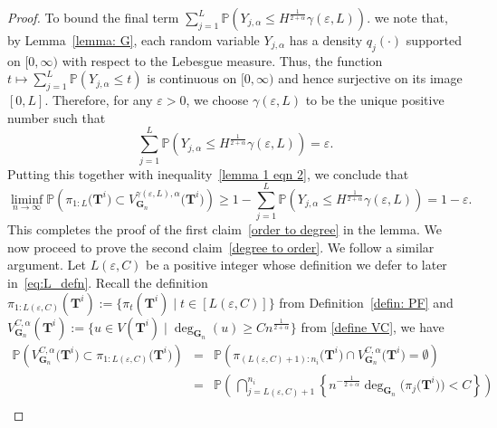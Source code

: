\documentclass[twoside,11pt]{article}
\theoremstyle{remark}
\begin{document}
\begin{proof}
To bound the final term $\sum_{j=1}^L \mathbb{P}\left(Y_{j, \alpha} \leq H^{\frac{1}{2+\alpha}} \gamma\left(\varepsilon, L\right)\right)$.
we note that, by Lemma~\ref{lemma: G}, each random variable $Y_{j, \alpha}$ has a density $q_j(\cdot)$ supported on $[0, \infty)$ with respect to the Lebesgue measure. Thus, the function $t \mapsto \sum_{j=1}^L \mathbb{P}(Y_{j, \alpha} \leq t )$ is continuous on $[0, \infty)$ and hence surjective on its image $[0, L]$. Therefore, for any $\varepsilon > 0$, we choose $\gamma\left(\varepsilon, L\right)$ to be the unique positive number such that  
%
\begin{equation}
\label{eq:gamma_defn}   
\sum_{j=1}^L \mathbb{P}\left(Y_{j, \alpha} \leq H^{\frac{1}{2+\alpha}}\gamma\left(\varepsilon,L\right)\right) = \varepsilon.  
\end{equation}
%
Putting this together with inequality~\eqref{lemma 1 eqn 2}, we conclude that
%
\begin{equation*}
  \liminf_{n \rightarrow \infty} \mathbb{P}\left(\pi_{1:L}\bigl(\boldsymbol{T}^i\bigr)\subset  V^{\gamma\left(\varepsilon, L\right), \alpha}_{\boldsymbol{G}_n}\bigl(\boldsymbol{T}^i\bigr)\right)\geq  1-\sum^L_{j=1} \mathbb{P}\left(Y_{j, \alpha} \leq H^{\frac{1}{2+\alpha}}\gamma\left(\varepsilon, L\right) \right) = 1-\varepsilon.
\end{equation*}
%
This completes the proof of the first claim~\eqref{order to degree} in the lemma.
We now proceed to prove the second claim~\eqref{degree to order}. We follow a similar argument. Let $L(\varepsilon, C)$ be a positive integer whose definition we defer to later in~\eqref{eq:L_defn}. Recall the definition $\pi_{1:L\left(\varepsilon, C\right)}\left(\boldsymbol{T}^i\right):=\bigl\{{\pi}_t\left(\boldsymbol{T}^i\right)\mid t \in [L(\varepsilon, C)] \bigr\}$ from Definition~\ref{defin: PF} and $V^{C,\alpha}_{\boldsymbol{G}_n}\left(\boldsymbol{T}^i\right):= \bigl\{ u \in V\left(\boldsymbol{T}^i\right) \mid \operatorname{deg}_{\boldsymbol{G}_n}\left(u\right) \ge Cn^{\frac{1}{2+\alpha}} \bigr\}$ from \eqref{define VC}, we have
%
\begin{eqnarray*}
    \mathbb{P}\left( V^{C,\alpha}_{\boldsymbol{G}_n}\bigl(\boldsymbol{T}^i\bigr)\subset\pi_{1:{L\left(\varepsilon, C\right)}}\bigl(\boldsymbol{T}^i\bigr)\right)&=& \mathbb{P}\left( \pi_{\left({L\left(\varepsilon, C\right)+1}\right):{n_i}}\bigl(\boldsymbol{T}^i\bigr)\cap V^{C,\alpha}_{\boldsymbol{G}_n}\bigl(\boldsymbol{T}^i\bigr)=\emptyset\right)\\
    &=& 
    \mathbb{P}\left(\, \bigcap^{n_i}_{j=L\left(\varepsilon, C\right)+1}\left\{n^{-\frac{1}{2+\alpha}}\operatorname{deg}_{\boldsymbol{G}_n}\bigl(\pi_{j}\bigl(\boldsymbol{T}^i\bigr)\bigr)<C \right\}\right)\\

\end{eqnarray*}
\end{proof}
\end{document}
